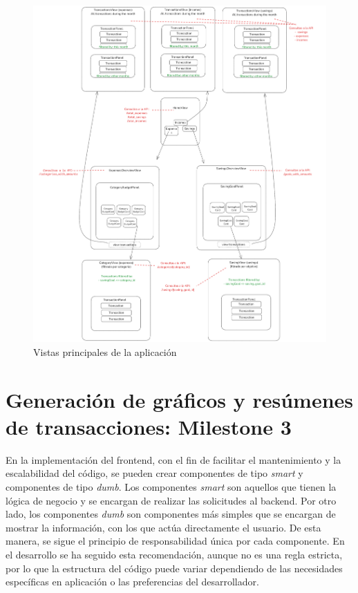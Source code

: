 \begin{figure}[ht!]
    \centering
    \includegraphics[width=\linewidth]{imagenes/componentes-frontend.png}
    \caption{Vistas principales de la aplicación}
    \label{fig:componentes_frontend}
\end{figure}



\section{Generación de gráficos y resúmenes de transacciones: Milestone 3}\label{chap:milestone3}
En la implementación del frontend, con el fin de facilitar el mantenimiento y la escalabilidad del código, se pueden crear componentes de tipo \textit{smart} y componentes de tipo \textit{dumb}. Los componentes \textit{smart} son aquellos que tienen la lógica de negocio y se encargan de realizar las solicitudes al backend. Por otro lado, los componentes \textit{dumb} son componentes más simples que se encargan de mostrar la información, con los que actúa directamente el usuario. De esta manera, se sigue el principio de responsabilidad única por cada componente. En el desarrollo se ha seguido esta recomendación, aunque no es una regla estricta, por lo que la estructura del código puede variar dependiendo de las necesidades específicas en aplicación o las preferencias del desarrollador.\\

